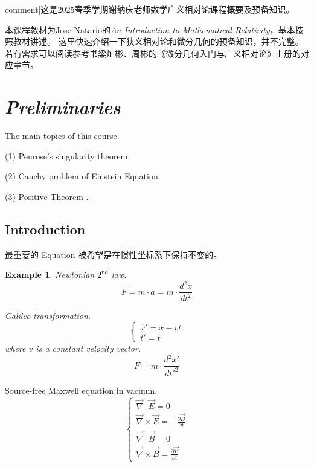 
\newtheorem{prop}{Prop}
\newtheorem{def}{Definition}
\newtheorem{example}{Example}

{{comment|这是2025春季学期谢纳庆老师数学广义相对论课程概要及预备知识。}}

本课程教材为Jose Natario的\textit{An Introduction to Mathematical Relativity}，基本按照教材讲述。
这里快速介绍一下狭义相对论和微分几何的预备知识，并不完整。
若有需求可以阅读参考书梁灿彬、周彬的《微分几何入门与广义相对论》上册的对应章节。

\section{\textit{Preliminaries} }

The main topics of this course.

(1) Penrose’s singularity theorem. 

(2) Cauchy problem of Einstein Equation.

(3) Positive Theorem  .

\subsection{Introduction}
最重要的 Equation 被希望是在惯性坐标系下保持不变的。
\begin{example}
     Newtonian \(2^{\text{nd}}\) law.
\[ F = m \cdot a = m \cdot \frac{d^2 x}{dt^2} \]

Galileo transformation.
\[\begin{cases}
x' = x - vt \\
t' = t
\end{cases}\]
where \(v\) is a constant velocity vector.
\[F = m \cdot \frac{d^2 x'}{dt'^2}\]
\end{example}


Source-free Maxwell equation in vacuum.
\[\begin{cases}
\vec{\nabla} \cdot \vec{E} = 0 \\
\vec{\nabla} \times \vec{E} = -\frac{\partial \vec{B}}{\partial t} \\
\vec{\nabla} \cdot \vec{B} = 0 \\
\vec{\nabla} \times \vec{B} = \frac{\partial \vec{E}}{\partial t}
\end{cases}\]


